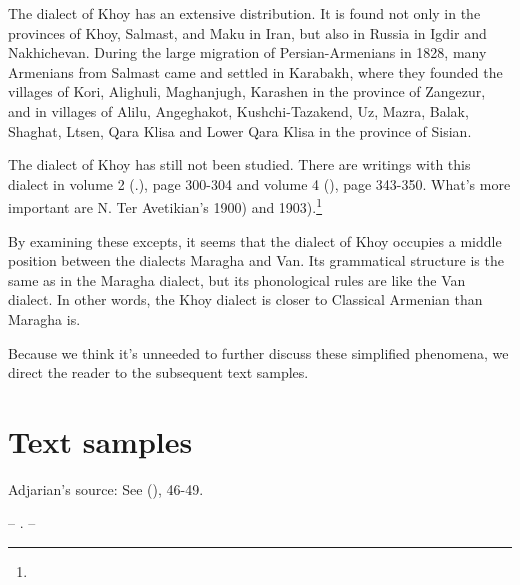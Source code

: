 The dialect of Khoy has an extensive distribution. It is found not only in the provinces of Khoy, Salmast, and Maku in Iran, but also in Russia in Igdir and Nakhichevan. During the large migration of Persian-Armenians in 1828, many Armenians from Salmast came and settled in Karabakh, where they founded the villages of Kori, Alighuli, Maghanjugh, Karashen in the province of Zangezur, and in villages of Alilu, Angeghakot, Kushchi-Tazakend, Uz, Mazra, Balak, Shaghat, Ltsen, Qara Klisa and Lower Qara Klisa in the province of Sisian. 

The dialect of Khoy has still not been studied. There are writings with this dialect in \citeauthor{Eminian} volume 2 (.), page 300-304 and volume 4 (), page 343-350. What's more important are N. Ter Avetikian's  1900) and  1903).\footnote{}

By examining these excepts, it seems that the dialect of Khoy occupies a middle position between the dialects Maragha and Van. Its grammatical structure is the same as in the Maragha dialect, but its phonological rules are like the Van dialect. In other words, the Khoy dialect is closer to Classical Armenian than Maragha is. 

Because we think it's unneeded to further discuss these simplified phenomena, we direct the reader to the subsequent text samples. 

\begin{adjarianpage}\label{page:289}\end{adjarianpage}%

\section{Text samples}

{\sampleoverview}

Adjarian's source: See  (),  46-49. 




– . – 

